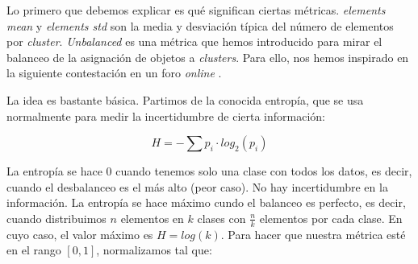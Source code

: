 \documentclass[11pt]{article}
\begin{document}
\begin{table}[H]
\begin{center}
\end{center}
\caption{Resultados de los algoritmos según distintas métricas de evaluación}
    \label{resultados_stcase01:tabla}
\end{table}

Lo primero que debemos explicar es qué significan ciertas métricas. \emph{elements mean} y \emph{elements std} son la media y desviación típica del número de elementos por \emph{cluster}. \emph{Unbalanced} es una métrica que hemos introducido para mirar el balanceo de la asignación de objetos a \emph{clusters}. Para ello, nos hemos inspirado en la siguiente contestación en un foro \emph{online} \cite{entropy_for_unbalanced:online}.

La idea es bastante básica. Partimos de la conocida entropía, que se usa normalmente para medir la incertidumbre de cierta información:

$$H = - \sum p_i \cdot log_2(p_i)$$

La entropía se hace 0 cuando tenemos solo una clase con todos los datos, es decir, cuando el desbalanceo es el más alto (peor caso). No hay incertidumbre en la información. La entropía se hace máximo cundo el balanceo es perfecto, es decir, cuando distribuimos $n$ elementos en $k$ clases con $\frac{n}{k}$ elementos por cada clase. En cuyo caso, el valor máximo es $H = log(k)$. Para hacer que nuestra métrica esté en el rango $[0, 1]$, normalizamos tal que:
\end{document}
